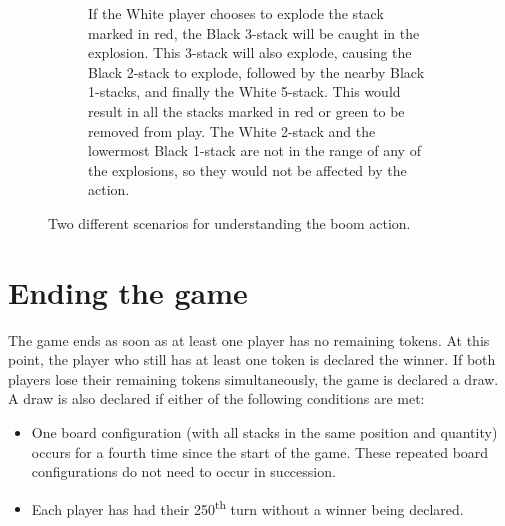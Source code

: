 \documentclass[]{article}
\newcommand{\white}[3] {
    \foreach \x in {1,...,#3}
        \node[draw,thick,minimum size=17,fill=black!30,circle]
            at ({.5+#1},{\x*.1+.4+#2}) {};
    \node[draw,thick,minimum size=17,fill=white,circle]
        at ({.5+#1},{#3*.1+.5+#2}) {};
    \node[]
        at ({.5+#1},{#3*.1+.5+#2}) {\large #3};
}
\newcommand{\black}[3] {
    \foreach \x in {1,...,#3}
        \node[draw,thick,minimum size=15,fill=black!60,rounded corners=0.6mm]
            at ({.5+#1},{\x*.1+.4+#2}) {};
    \node[draw,thick,minimum size=15,fill=black!30,rounded corners=0.6mm]
        at ({.5+#1},{#3*.1+.5+#2}) {};
    \node[]
        at ({.5+#1},{#3*.1+.5+#2}) {\large #3};
}
\begin{document}
\begin{figure}[ht!]
\begin{subfigure}{.60\textwidth}
    \caption{\label{fig:chain}
        If the White player chooses to explode the stack marked in red, the Black 3-stack
    will be caught in the explosion. This 3-stack will also explode, causing the Black 2-stack
    to explode, followed by the nearby Black 1-stacks, and finally the White 5-stack.
        This would result in all the stacks marked in red or green to be removed from play.
        The White 2-stack and the lowermost Black 1-stack are not in the range of any of the
        explosions, so they would not be affected by the action.
    }
\end{subfigure}
\caption{\label{fig:boom}
    Two different scenarios for understanding the boom action.
}
\end{figure}

\section*{Ending the game}

The game ends as soon as at least one player has no remaining tokens.
At this point, the player who still has at least one token is declared
the winner.
If both players lose their remaining tokens simultaneously, the game is
declared a draw.
A draw is also declared if either of the following conditions are met:

\begin{itemize}
    \item
        One board configuration (with all stacks in the same position and
        quantity) occurs for a fourth time since the start of the game.
        These repeated board configurations do not need to occur in
        succession.
    \item
        Each player has had their 250\textsuperscript{th} turn without
        a winner being declared.
\end{itemize}
\end{document}
